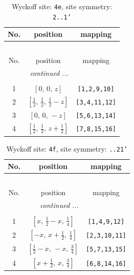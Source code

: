 \documentclass[fleqn,8pt]{jsarticle}
\begin{document}
\begin{longtable}{ccc}
\caption{Wyckoff site: {\tt 4e}, site symmetry: {\tt 2..1'}}
 \\
 \hline \hline
No. & position & mapping \\ \hline \endfirsthead

\multicolumn{2}{l}{\tablename\ \thetable{}} \\
 \hline \hline
No. & position & mapping \\ \hline \endhead

 \hline \hline
\multicolumn{2}{r}{\footnotesize\it continued ...} \\ \endfoot

 \hline \hline
\multicolumn{2}{r}{} \\ \endlastfoot

1 & $\left[ 0,\, 0,\, z \right]$ & {\tt [1,2,9,10]} \\ \hline
2 & $\left[ \frac{1}{2},\, \frac{1}{2},\, \frac{1}{2} - z \right]$ & {\tt [3,4,11,12]} \\ \hline
3 & $\left[ 0,\, 0,\, - z \right]$ & {\tt [5,6,13,14]} \\ \hline
4 & $\left[ \frac{1}{2},\, \frac{1}{2},\, z + \frac{1}{2} \right]$ & {\tt [7,8,15,16]} \\
\end{longtable}
\renewcommand{\arraystretch}{1.2}
\begin{longtable}{ccc}
\caption{Wyckoff site: {\tt 4f}, site symmetry: {\tt ..21'}}
 \\
 \hline \hline
No. & position & mapping \\ \hline \endfirsthead

\multicolumn{2}{l}{\tablename\ \thetable{}} \\
 \hline \hline
No. & position & mapping \\ \hline \endhead

 \hline \hline
\multicolumn{2}{r}{\footnotesize\it continued ...} \\ \endfoot

 \hline \hline
\multicolumn{2}{r}{} \\ \endlastfoot

1 & $\left[ x,\, \frac{1}{2} - x,\, \frac{1}{4} \right]$ & {\tt [1,4,9,12]} \\ \hline
2 & $\left[ - x,\, x + \frac{1}{2},\, \frac{1}{4} \right]$ & {\tt [2,3,10,11]} \\ \hline
3 & $\left[ \frac{1}{2} - x,\, - x,\, \frac{3}{4} \right]$ & {\tt [5,7,13,15]} \\ \hline
4 & $\left[ x + \frac{1}{2},\, x,\, \frac{3}{4} \right]$ & {\tt [6,8,14,16]} \\
\end{longtable}
\end{document}

